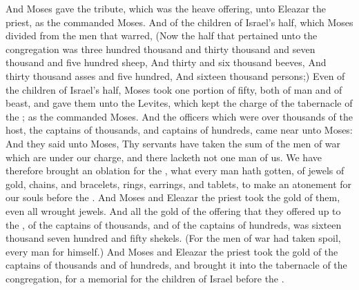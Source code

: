 \begin{biblechapter}
\verse And Moses gave the tribute, which was the \LORDs heave offering, unto Eleazar the priest, as the \LORD commanded Moses.
\verse And of the children of Israel's half, which Moses divided from the men that warred,
\verse (Now the half that pertained unto the congregation was three hundred thousand and thirty thousand and seven thousand and five hundred sheep,
\verse And thirty and six thousand beeves,
\verse And thirty thousand asses and five hundred,
\verse And sixteen thousand persons;)
\verse Even of the children of Israel's half, Moses took one portion of fifty, both of man and of beast, and gave them unto the Levites, which kept the charge of the tabernacle of the \LORD; as the \LORD commanded Moses.
\verse And the officers which were over thousands of the host, the captains of thousands, and captains of hundreds, came near unto Moses:
\verse And they said unto Moses, Thy servants have taken the sum of the men of war which are under our charge, and there lacketh not one man of us.
\verse We have therefore brought an oblation for the \LORD, what every man hath gotten, of jewels of gold, chains, and bracelets, rings, earrings, and tablets, to make an atonement for our souls before the \LORD.
\verse And Moses and Eleazar the priest took the gold of them, even all wrought jewels.
\verse And all the gold of the offering that they offered up to the \LORD, of the captains of thousands, and of the captains of hundreds, was sixteen thousand seven hundred and fifty shekels.
\verse (For the men of war had taken spoil, every man for himself.)
\verse And Moses and Eleazar the priest took the gold of the captains of thousands and of hundreds, and brought it into the tabernacle of the congregation, for a memorial for the children of Israel before the \LORD.
\end{biblechapter}

